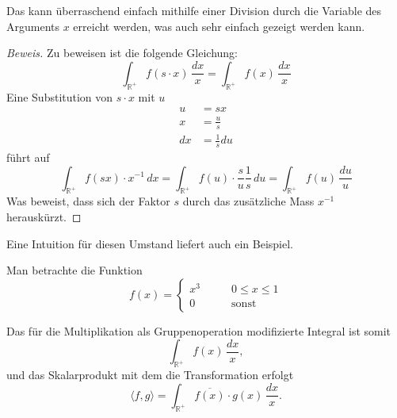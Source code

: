 Das kann überraschend einfach mithilfe einer Division durch die Variable des Arguments $x$ erreicht werden, was auch sehr einfach gezeigt 
werden kann.
\begin{proof}[Beweis]
    Zu beweisen ist die folgende Gleichung:
    \[
        \int_\mathbb{R^+} f(s \cdot x)\,\frac{dx}{x} = \int_\mathbb{R^+} f(x)\,\frac{dx}{x}
    \]
    Eine Substitution von $s \cdot x$ mit $u$
    \[
    \begin{aligned}
        u &= sx \\
        x &= \frac{u}{s} \\
        dx &= \frac{1}{s} du
    \end{aligned}
    \]
    führt auf
    \[
        \int_\mathbb{R^+} f(sx) \cdot x^{-1}\,dx = \int_\mathbb{R^+} f(u) \cdot \frac{s}{u} \frac{1}{s}\,du 
        = \int_\mathbb{R^+} f(u)\,\frac{du}{u}
    \]
    Was beweist, dass sich der Faktor $s$ durch das zusätzliche Mass $x^{-1}$ herauskürzt. 
\end{proof}
Eine Intuition für diesen Umstand liefert auch ein Beispiel.
\begin{beispiel}
Man betrachte die Funktion 
\[
f(x) 
= 
\begin{cases}
    x^3 &\qquad 0\leq x\leq 1\\
    0 &\qquad \text{sonst}
\end{cases}
\]
\end{beispiel}
Das für die Multiplikation als Gruppenoperation modifizierte Integral ist somit
\begin{equation}
    \int_\mathbb{R^+} f(x)\,\frac{dx}{x},
\end{equation}
und das Skalarprodukt mit dem die Transformation erfolgt
\begin{equation}
    \langle f,g \rangle = \int_\mathbb{R^+} \overline{f(x)} \cdot g(x) \,\frac{dx}{x}.
\end{equation}


